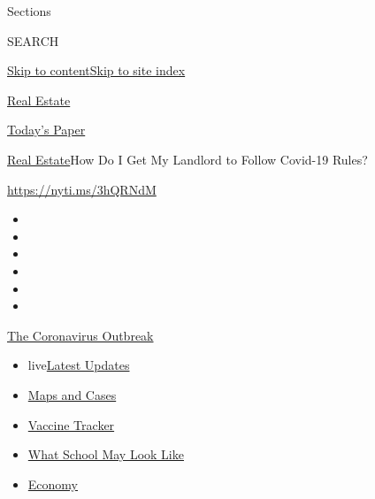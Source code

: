 Sections

SEARCH

\protect\hyperlink{site-content}{Skip to
content}\protect\hyperlink{site-index}{Skip to site index}

\href{https://www.nytimes.com/section/realestate}{Real Estate}

\href{https://myaccount.nytimes.com/auth/login?response_type=cookie\&client_id=vi}{}

\href{https://www.nytimes.com/section/todayspaper}{Today's Paper}

\href{/section/realestate}{Real Estate}\textbar{}How Do I Get My
Landlord to Follow Covid-19 Rules?

\url{https://nyti.ms/3hQRNdM}

\begin{itemize}
\item
\item
\item
\item
\item
\item
\end{itemize}

\href{https://www.nytimes.com/news-event/coronavirus?action=click\&pgtype=Article\&state=default\&region=TOP_BANNER\&context=storylines_menu}{The
Coronavirus Outbreak}

\begin{itemize}
\tightlist
\item
  live\href{https://www.nytimes.com/2020/08/01/world/coronavirus-covid-19.html?action=click\&pgtype=Article\&state=default\&region=TOP_BANNER\&context=storylines_menu}{Latest
  Updates}
\item
  \href{https://www.nytimes.com/interactive/2020/us/coronavirus-us-cases.html?action=click\&pgtype=Article\&state=default\&region=TOP_BANNER\&context=storylines_menu}{Maps
  and Cases}
\item
  \href{https://www.nytimes.com/interactive/2020/science/coronavirus-vaccine-tracker.html?action=click\&pgtype=Article\&state=default\&region=TOP_BANNER\&context=storylines_menu}{Vaccine
  Tracker}
\item
  \href{https://www.nytimes.com/interactive/2020/07/29/us/schools-reopening-coronavirus.html?action=click\&pgtype=Article\&state=default\&region=TOP_BANNER\&context=storylines_menu}{What
  School May Look Like}
\item
  \href{https://www.nytimes.com/live/2020/07/31/business/stock-market-today-coronavirus?action=click\&pgtype=Article\&state=default\&region=TOP_BANNER\&context=storylines_menu}{Economy}
\end{itemize}

